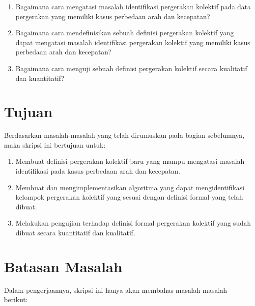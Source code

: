 \fi
\begin{enumerate}
    \item Bagaimana cara mengatasi masalah identifikasi pergerakan kolektif pada data pergerakan yang memiliki kasus perbedaan arah dan kecepatan?
    \item Bagaimana cara mendefinisikan sebuah definisi pergerakan kolektif yang dapat mengatasi masalah identifikasi pergerakan kolektif yang memiliki kasus perbedaan arah dan kecepatan?
    \item Bagaimana cara menguji sebuah definisi pergerakan kolektif secara kualitatif dan kuantitatif?
\end{enumerate}

\section{Tujuan}
\label{sec:tujuan}  

Berdasarkan masalah-masalah yang telah dirumuskan pada bagian sebelumnya, maka skripsi ini bertujuan untuk:

\begin{enumerate}
    \iffalse 
    \item Menentukan ukuran-ukuran lintasan yang mampu mengatasi masalah identifikasi pergerakan kolektif di mana terdapat kasus perbedaan arah dan kecepatan.
    
    \fi
    \item Membuat definisi pergerakan kolektif baru yang mampu mengatasi masalah identifikasi pada kasus perbedaan arah dan kecepatan.
    \item Membuat dan mengimplementasikan algoritma yang dapat mengidentifikasi kelompok pergerakan kolektif yang sesuai dengan definisi formal yang telah dibuat.
    \item Melakukan pengujian terhadap definisi formal pergerakan kolektif yang sudah dibuat secara kuantitatif dan kualitatif.
\end{enumerate}

\section{Batasan Masalah}
\label{sec:batasan}

Dalam pengerjaannya, skripsi ini hanya akan membahas masalah-masalah berikut:


